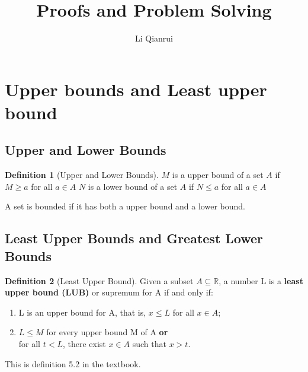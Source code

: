 \documentclass{article}
\title{Proofs and Problem Solving}
\author{Li Qianrui}
\theoremstyle{definition}
\newtheorem{definition}{Definition}[section]
\theoremstyle{definition}
\theoremstyle{remark}
\begin{document}
\maketitle
\tableofcontents

\newpage

\section{Upper bounds and Least upper bound}

\subsection{Upper and Lower Bounds}
\begin{definition}[Upper and Lower Bounds]
$M$ is a upper bound of a set $A$ if $M \geq a$ for all $a \in A$ 
$N$ is a lower bound of a set $A$ if $N \leq a$ for all $a \in A$

A set is bounded if it has both a upper bound and a lower bound.

\end{definition}


\subsection{Least Upper Bounds and Greatest Lower Bounds}

\begin{definition}[Least Upper Bound]
Given a subset $A\subseteq \mathbb{R}$, a number L is a \textbf{least upper bound (LUB)} or supremum for A if and only if:
\begin{enumerate}
	\item L is an upper bound for A, that is, $x\leq L$ for all $x\in A$;\\
	\item $L\leq M$ for every upper bound M of A \textbf{or} \\ for all $t < L$, there exist $x\in A$ such that $x>t$.\\
\end{enumerate}
This is definition 5.2 in the textbook.
\end{definition}
\end{document}
